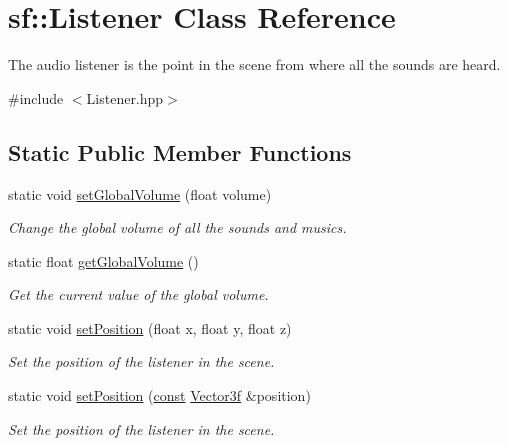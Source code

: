 \hypertarget{classsf_1_1_listener}{\section{sf\-:\-:Listener Class Reference}
\label{classsf_1_1_listener}
}


The audio listener is the point in the scene from where all the sounds are heard.  




{\ttfamily \#include $<$Listener.\-hpp$>$}

\subsection*{Static Public Member Functions}
\begin{DoxyCompactItemize}
\item 
static void \hyperlink{classsf_1_1_listener_a803a24a1fc04620cacc9f88c6fbc0e3a}{set\-Global\-Volume} (float volume)
\begin{DoxyCompactList}\small\item\em Change the global volume of all the sounds and musics. \end{DoxyCompactList}\item 
static float \hyperlink{classsf_1_1_listener_a137ea535799bdf70be6ec969673d4d33}{get\-Global\-Volume} ()
\begin{DoxyCompactList}\small\item\em Get the current value of the global volume. \end{DoxyCompactList}\item 
static void \hyperlink{classsf_1_1_listener_a5bc2d8d18ea2d8f339d23cbf17678564}{set\-Position} (float x, float y, float z)
\begin{DoxyCompactList}\small\item\em Set the position of the listener in the scene. \end{DoxyCompactList}\item 
static void \hyperlink{classsf_1_1_listener_a28a27d85cfbf8065c535c39176898fcb}{set\-Position} (\hyperlink{term__entry_8h_a57bd63ce7f9a353488880e3de6692d5a}{const} \hyperlink{namespacesf_a36e44d9e6d8f649703698ec9d24ac052}{Vector3f} \&position)
\begin{DoxyCompactList}\small\item\em Set the position of the listener in the scene. \end{DoxyCompactList}\item 

\end{DoxyCompactItemize}
